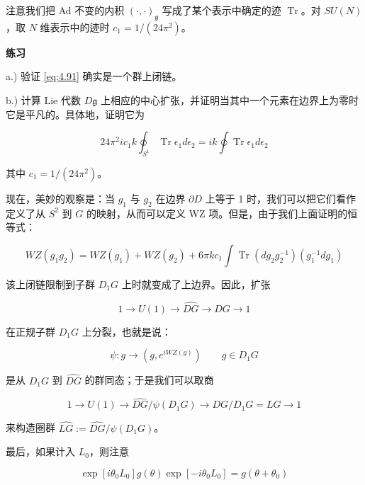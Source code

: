 注意我们把 Ad 不变的内积 $(\cdot,\cdot)_\mathfrak{g}$ 写成了某个表示中确定的迹 $\operatorname{Tr}$。对 $SU(N)$，取 $N$ 维表示中的迹时 $c_1=1/(24\pi^2)$。

\medskip\noindent\textbf{练习}\quad

a.) 验证 \eqref{eq:4.91} 确实是一个群上闭链。

b.) 计算 Lie 代数 $D\mathfrak{g}$ 上相应的中心扩张，并证明当其中一个元素在边界上为零时它是平凡的。具体地，证明它为

\begin{equation}
  24\pi^2ic_1k\oint_{S^1}\operatorname{Tr}\epsilon_1d\epsilon_2=ik\oint\operatorname{Tr}\epsilon_1d\epsilon_2
  \tag{4.92}
  \label{eq:4.92}
\end{equation}

其中 $c_1=1/(24\pi^2)$。

现在，美妙的观察是：当 $g_1$ 与 $g_2$ 在边界 $\partial D$ 上等于 1 时，我们可以把它们看作定义了从 $S^2$ 到 $G$ 的映射，从而可以定义 WZ 项。但是，由于我们上面证明的恒等式：

\begin{equation}
  WZ(g_1g_2)=WZ(g_1)+WZ(g_2)+6\pi kc_1\int\operatorname{Tr}(dg_2g_2^{-1})(g_1^{-1}dg_1)
  \tag{4.93}
  \label{eq:4.93}
\end{equation}

该上闭链限制到子群 $D_1G$ 上时就变成了上边界。因此，扩张

\begin{equation}
  1\to U(1)\to\widehat{DG}\to DG\to1
  \tag{4.94}
  \label{eq:4.94}
\end{equation}

在正规子群 $D_1G$ 上分裂，也就是说：

\begin{equation}
  \psi:g\to(g,e^{iWZ(g)})\qquad g\in D_1G
  \tag{4.95}
  \label{eq:4.95}
\end{equation}

是从 $D_1G$ 到 $\widehat{DG}$ 的群同态；于是我们可以取商

\begin{equation}
  1\to U(1)\to\widehat{DG}/\psi(D_1G)\to DG/D_1G=LG\to1
  \tag{4.96}
  \label{eq:4.96}
\end{equation}

来构造圈群 $\widehat{LG}:=\widehat{DG}/\psi(D_1G)$。

最后，如果计入 $L_0$，则注意

\begin{equation}
  \exp[i\theta_0L_0]g(\theta)\exp[-i\theta_0L_0]=g(\theta+\theta_0)
  \tag{4.97}
  \label{eq:4.97}
\end{equation}

